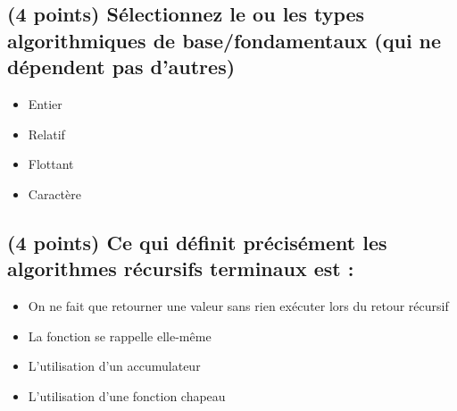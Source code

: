 \documentclass[11pt,a4paper]{article}
\begin{document}
\MakeExamTitle                   %




\renewcommand{\thesubsection}{\arabic{subsection}} %




\subsection{(4 points) Sélectionnez le ou les types algorithmiques de base/fondamentaux (qui ne dépendent pas d'autres) }

\begin{itemize}
  \item[\CaseCoche] Entier \\
  \item[\CaseCoche] Relatif \\
  \item[\CaseCoche] Flottant \\
  \item[\CaseCoche] Caractère \\
\end{itemize}


\bigskip


\subsection{(4 points) Ce qui définit précisément les algorithmes récursifs terminaux est : }

\begin{itemize}
  \item[\CaseCoche] On ne fait que retourner une valeur sans rien exécuter lors du retour récursif \\
  \item[\CaseCoche] La fonction se rappelle elle-même \\
  \item[\CaseCoche] L'utilisation d'un accumulateur \\
  \item[\CaseCoche] L'utilisation d'une fonction chapeau \\
\end{itemize}
\end{document}
